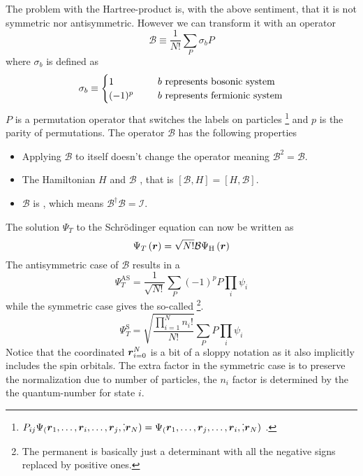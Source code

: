     The problem with the Hartree-product is, with the above sentiment, that it
    is not symmetric nor antisymmetric. However we can transform it with an
    operator
        \begin{equation}
            \mathcal{B} \equiv \frac{1}{N!}\sum_P\sigma_bP
        \end{equation}
    where $\sigma_b$ is defined as 
        \begin{equation}
            \sigma_b \equiv  
                \begin{cases}
                    1 \indent &\text{$b$ represents bosonic system} \\
                    (-1)^p \indent &\text{$b$ represents fermionic system}
                \end{cases}
        \end{equation}
    $P$ is a permutation operator that switches the labels on particles
    \footnote{$P_{ij}\Psi_(\boldsymbol{{r}}_1,\dots,\boldsymbol{{r}}_i,\dots,\boldsymbol{{r}}_j,\dot,\boldsymbol{{r}}_N)
    = \Psi_(\boldsymbol{{r}}_1,\dots,\boldsymbol{{r}}_j,\dots,\boldsymbol{{r}}_i,\dot,\boldsymbol{{r}}_N)$
    \cite{compphysThijssen}.} and $p$ is the parity of permutations. The
    operator $\mathcal{B}$ has the following properties
        \begin{itemize}
            \item Applying $\mathcal{B}$ to itself doesn't change the operator
                meaning $\mathcal{B}^2 = \mathcal{B}$.
            \item The Hamiltonian $H$ and $\mathcal{B}$ , that
                is $\left[\mathcal{B},H\right] = \left[H,\mathcal{B}\right]$.
            \item $\mathcal{B}$ is , which means
                $\mathcal{B}^{\dagger}\mathcal{B}=\mathcal{I}$.
        \end{itemize}
    The solution $\Psi_T$ to the Schrödinger equation can now be written as
        \begin{equation}
            \Psi_T\left(\boldsymbol{{r}}\right) =
            \sqrt{N!}\mathcal{B}\Psi_{\text{H}}\left(\boldsymbol{{r}}\right)
            \label{eq:psiOpB}
        \end{equation}
    The antisymmetric case of $\mathcal{B}$ results in a  
        \begin{equation}
            \Psi^{\text{AS}}_T = \frac{1}{\sqrt{N!}}\sum_{P}(-1)^pP\prod_i\psi_i
        \end{equation}
    while the symmetric case gives the so-called \footnote{The
    permanent is basically just a determinant with all the negative signs
    replaced by positive ones.}.
        \begin{equation}
            \Psi^{\text{S}}_T =
            \sqrt{\frac{\prod\limits^N_{i=1}n_i!}{N!}}\sum_{P}P\prod_i\psi_i
        \end{equation}
    Notice that the coordinated ${\boldsymbol{{r}}}_{i=0}^{N}$ is a bit of a sloppy
    notation as it also implicitly includes the spin orbitals. The extra factor
    in the symmetric case is to preserve the normalization due to number of
    particles, the $n_i$ factor is determined by the the quantum-number for
    state $i$.

